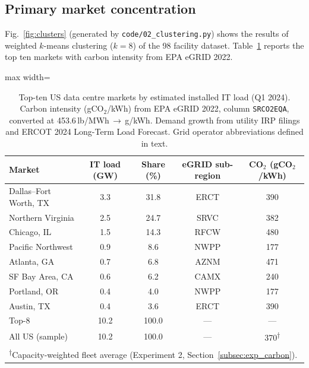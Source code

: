 \documentclass[preprint,12pt]{elsarticle}
\begin{document}
\subsection{Primary market concentration}
\label{subsec:geo_concentration}

\begin{sloppypar}
Fig.~\ref{fig:clusters} (generated by \texttt{code/02\_clustering.py})
shows the results of weighted $k$-means clustering ($k{=}8$) of the 98
facility dataset. Table~\ref{tab:top_markets} reports the top ten markets
with carbon intensity from EPA eGRID 2022.
\end{sloppypar}

\begin{table}[htbp]
\centering
\caption{Top-ten US data centre markets by estimated installed IT load
(Q1 2024). Carbon intensity (gCO$_2$/kWh) from EPA eGRID 2022, column
\texttt{SRCO2EQA}, converted at 453.6\,lb/MWh\,$\rightarrow$\,g/kWh.
Demand growth from utility IRP filings and ERCOT 2024 Long-Term Load
Forecast. Grid operator abbreviations defined in text.}
\label{tab:top_markets}
\small
\begin{adjustbox}{max width=\linewidth}
\begin{tabular}{@{}lcccc@{}}
\toprule
\textbf{Market} & \textbf{IT load (GW)} & \textbf{Share (\%)}
& \textbf{eGRID sub-region} & \textbf{CO$_2$ (gCO$_2$/kWh)} \\
\midrule
Dallas--Fort Worth, TX & 3.3 & 31.8 & ERCT & 390 \\
Northern Virginia & 2.5 & 24.7 & SRVC & 382 \\
Chicago, IL & 1.5 & 14.3 & RFCW & 480 \\
Pacific Northwest & 0.9 & 8.6 & NWPP & 177 \\
Atlanta, GA & 0.7 & 6.8 & AZNM & 471 \\
SF Bay Area, CA & 0.6 & 6.2 & CAMX & 240 \\
Portland, OR & 0.4 & 4.0 & NWPP & 177 \\
Austin, TX & 0.4 & 3.6 & ERCT & 390 \\
\midrule
Top-8 & 10.2 & 100.0 & — & — \\
All US (sample) & 10.2 & 100.0 & — & 370\textsuperscript{$\dagger$} \\
\bottomrule
\multicolumn{5}{l}{\footnotesize\textsuperscript{$\dagger$}Capacity-weighted
fleet average (Experiment 2, Section~\ref{subsec:exp_carbon}).}
\end{tabular}
\end{adjustbox}
\end{table}
\end{document}

